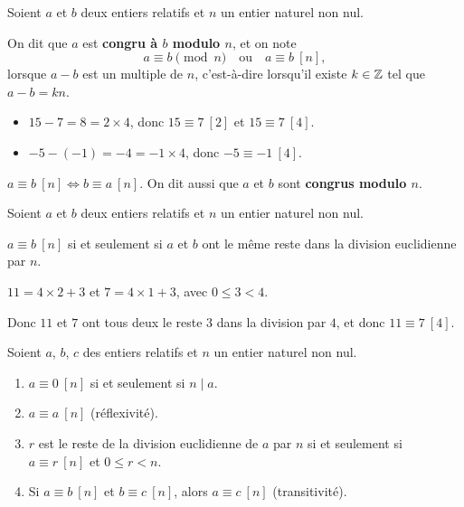 \begin{definition}
	Soient $a$ et $b$ deux entiers relatifs et $n$ un entier naturel non nul.

	On dit que $a$ est \textbf{congru à $b$ modulo $n$}, et on note
	$$
	a \equiv b \pmod{n} \quad \text{ou} \quad a \equiv b\ [n],
	$$
	lorsque $a - b$ est un multiple de $n$, c'est-à-dire lorsqu'il existe $k \in \mathbb{Z}$ tel que $a - b = kn$.
\end{definition}

\begin{exemple}
	\begin{itemize}[label=\textbullet]
		\item $15 - 7 = 8 = 2 \times 4$, donc $15 \equiv 7\ [2]$ et $15 \equiv 7\ [4]$.
		\item $-5 - (-1) = -4 = -1 \times 4$, donc $-5 \equiv -1\ [4]$.
	\end{itemize}
\end{exemple}

\remarque
$a \equiv b\ [n] \iff b \equiv a\ [n]$. On dit aussi que $a$ et $b$ sont \textbf{congrus modulo $n$}.

\begin{propriete}{}{}
	Soient $a$ et $b$ deux entiers relatifs et $n$ un entier naturel non nul.

	$a \equiv b\ [n]$ si et seulement si $a$ et $b$ ont le même reste dans la division euclidienne par $n$.
\end{propriete}

\begin{exemple}
	$11 = 4 \times 2 + 3$ et $7 = 4 \times 1 + 3$, avec $0 \leqslant 3 < 4$.

	Donc $11$ et $7$ ont tous deux le reste $3$ dans la division par $4$, et donc $11 \equiv 7\ [4]$.
\end{exemple}

\begin{propriete}{}{}
	Soient $a$, $b$, $c$ des entiers relatifs et $n$ un entier naturel non nul.
	\begin{enumerate}
		\item $a \equiv 0\ [n]$ si et seulement si $n \mid a$.
		\item $a \equiv a\ [n]$ \quad (réflexivité).
		\item $r$ est le reste de la division euclidienne de $a$ par $n$ si et seulement si
		$a \equiv r\ [n]$ et $0 \leqslant r < n$.
		\item Si $a \equiv b\ [n]$ et $b \equiv c\ [n]$, alors $a \equiv c\ [n]$ \quad (transitivité).
	\end{enumerate}
\end{propriete}

